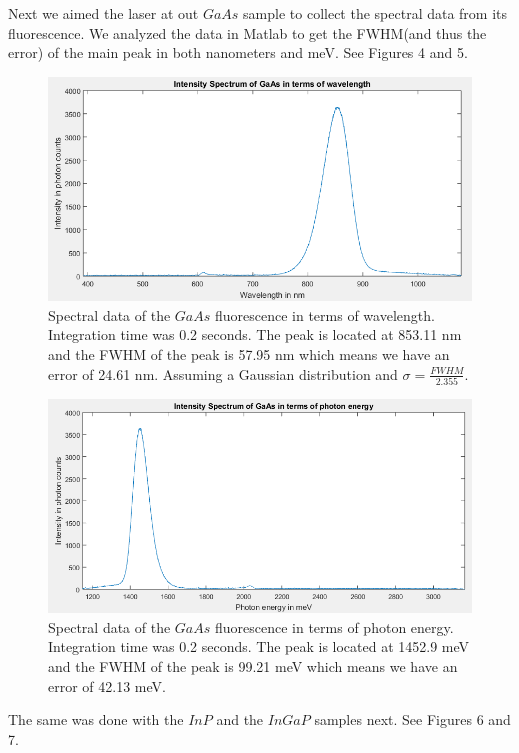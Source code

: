 \documentclass{article}
\begin{document}
Next we aimed the laser at out $GaAs$ sample to collect the spectral data from its fluorescence.  We analyzed the data in Matlab to get the FWHM(and thus the error) of the main peak in both nanometers and meV.  See Figures 4 and 5.

\begin{figure}[H]
\includegraphics[scale=.65,center]{GaAsNm.PNG}
\caption{Spectral data of the $GaAs$ fluorescence in terms of wavelength.  Integration time was 0.2 seconds.  The peak is located at 853.11 nm and the FWHM of the peak is 57.95 nm which means we have an error of 24.61 nm.  Assuming a Gaussian distribution and $\sigma=\frac{FWHM}{2.355}.$}
\end{figure}

\begin{figure}[H]
\includegraphics[scale=.65,center]{GaAsEv.PNG}
\caption{Spectral data of the $GaAs$ fluorescence in terms of photon energy.  Integration time was 0.2 seconds.  The peak is located at 1452.9 meV and the FWHM of the peak is 99.21 meV which means we have an error of 42.13 meV.}
\end{figure}

The same was done with the $InP$ and the $InGaP$ samples next.  See Figures 6 and 7.
\end{document}
